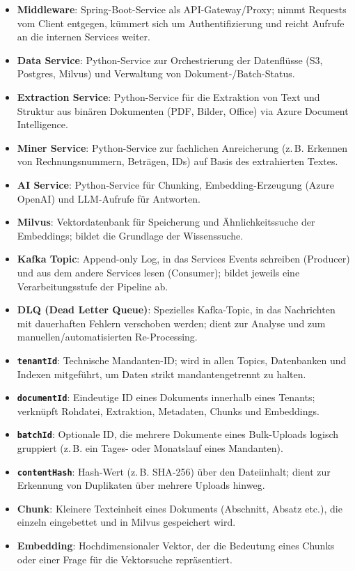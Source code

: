 \begin{itemize}
\tightlist
\item
  \textbf{Middleware}: Spring-Boot-Service als API-Gateway/Proxy; nimmt
  Requests vom Client entgegen, kümmert sich um Authentifizierung und
  reicht Aufrufe an die internen Services weiter.
\item
  \textbf{Data Service}: Python-Service zur Orchestrierung der
  Datenflüsse (S3, Postgres, Milvus) und Verwaltung von
  Dokument‑/Batch-Status.
\item
  \textbf{Extraction Service}: Python-Service für die Extraktion von
  Text und Struktur aus binären Dokumenten (PDF, Bilder, Office) via
  Azure Document Intelligence.
\item
  \textbf{Miner Service}: Python-Service zur fachlichen Anreicherung
  (z.\,B. Erkennen von Rechnungsnummern, Beträgen, IDs) auf Basis des
  extrahierten Textes.
\item
  \textbf{AI Service}: Python-Service für Chunking, Embedding-Erzeugung
  (Azure OpenAI) und LLM-Aufrufe für Antworten.
\item
  \textbf{Milvus}: Vektordatenbank für Speicherung und Ähnlichkeitssuche
  der Embeddings; bildet die Grundlage der Wissenssuche.
\item
  \textbf{Kafka Topic}: Append-only Log, in das Services Events
  schreiben (Producer) und aus dem andere Services lesen (Consumer);
  bildet jeweils eine Verarbeitungsstufe der Pipeline ab.
\item
  \textbf{DLQ (Dead Letter Queue)}: Spezielles Kafka-Topic, in das
  Nachrichten mit dauerhaften Fehlern verschoben werden; dient zur
  Analyse und zum manuellen/automatisierten Re-Processing.
\item
  \textbf{\texttt{tenantId}}: Technische Mandanten-ID; wird in allen
  Topics, Datenbanken und Indexen mitgeführt, um Daten strikt
  mandantengetrennt zu halten.
\item
  \textbf{\texttt{documentId}}: Eindeutige ID eines Dokuments innerhalb
  eines Tenants; verknüpft Rohdatei, Extraktion, Metadaten, Chunks und
  Embeddings.
\item
  \textbf{\texttt{batchId}}: Optionale ID, die mehrere Dokumente eines
  Bulk-Uploads logisch gruppiert (z.\,B. ein Tages- oder Monatslauf
  eines Mandanten).
\item
  \textbf{\texttt{contentHash}}: Hash-Wert (z.\,B. SHA‑256) über den
  Dateiinhalt; dient zur Erkennung von Duplikaten über mehrere Uploads
  hinweg.
\item
  \textbf{Chunk}: Kleinere Texteinheit eines Dokuments (Abschnitt,
  Absatz etc.), die einzeln eingebettet und in Milvus gespeichert wird.
\item
  \textbf{Embedding}: Hochdimensionaler Vektor, der die Bedeutung eines
  Chunks oder einer Frage für die Vektorsuche repräsentiert.
\end{itemize}

